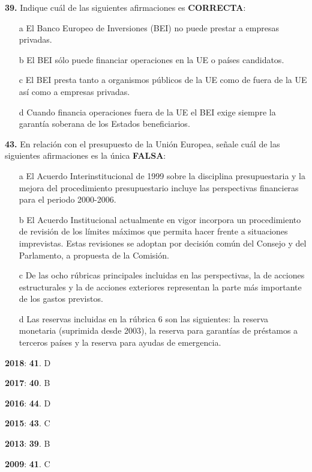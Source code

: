 \documentclass{nuevotema}
\begin{document}
\textbf{39.} Indique cuál de las siguientes afirmaciones es \textbf{CORRECTA}:
\begin{enumerate}
	\item[a] El Banco Europeo de Inversiones (BEI) no puede prestar a empresas privadas.
	\item[b] El BEI sólo puede financiar operaciones en la UE o países candidatos.
	\item[c] El BEI presta tanto a organismos públicos de la UE como de fuera de la UE así como a empresas privadas.
	\item[d] Cuando financia operaciones fuera de la UE el BEI exige siempre la garantía soberana de los Estados beneficiarios.
\end{enumerate}

\textbf{43.} En relación con el presupuesto de la Unión Europea, señale cuál de las siguientes afirmaciones es la única \textbf{FALSA}:
\begin{enumerate}
	\item[a] El Acuerdo Interinstitucional de 1999 sobre la disciplina presupuestaria y la mejora del procedimiento presupuestario incluye las perspectivas financieras para el periodo 2000-2006.
	\item[b] El Acuerdo Institucional actualmente en vigor incorpora un procedimiento de revisión de los límites máximos que permita hacer frente a situaciones imprevistas. Estas revisiones se adoptan por decisión común del Consejo y del Parlamento, a propuesta de la Comisión.
	\item[c] De las ocho rúbricas principales incluidas en las perspectivas, la de acciones estructurales y la de acciones exteriores representan la parte más importante de los gastos previstos.
	\item[d] Las reservas incluidas en la rúbrica 6 son las siguientes: la reserva monetaria (suprimida desde 2003), la reserva para garantías de préstamos a terceros países y la reserva para ayudas de emergencia.
\end{enumerate}

\notas

\textbf{2018}: \textbf{41}. D

\textbf{2017}: \textbf{40}. B

\textbf{2016}: \textbf{44}. D

\textbf{2015}: \textbf{43}. C

\textbf{2013}: \textbf{39}. B

\textbf{2009}: \textbf{41}. C
\end{document}
